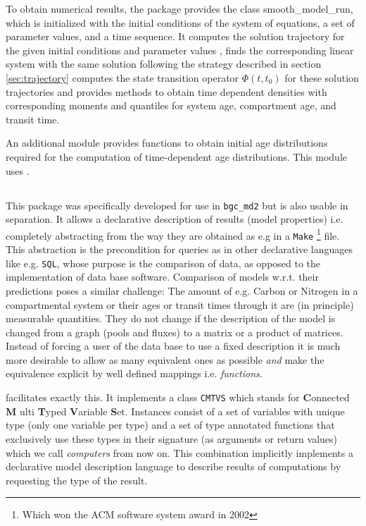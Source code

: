 To obtain numerical results, the package
provides the class smooth\_model\_run, which is initialized with the initial
conditions of the system of equations, a set of parameter values, and a time
sequence. It computes the solution trajectory for the given initial conditions and
parameter values , finds the corresponding linear system with the same solution
following the strategy described in section \ref{sec:trajectory} computes the
state transition operator $\Phi(t, t_0)$ for these solution trajectories and 
provides methods to obtain time dependent densities with corresponding moments and quantiles for system age, compartment age, and transit time. 

An additional module provides functions to obtain initial age distributions
required for the computation of time-dependent age distributions. 
This module uses \LAPM.

\subsection{\ComputabilityGraphs}
This package was specifically developed for use in \texttt{bgc\_md2} but is also usable in separation.
It allows a declarative description of results (model properties) i.e. completely abstracting from the way they are obtained as e.g in a \texttt{Make} 
\footnote{Which won the ACM software system award in 2002} file.  This
abstraction is the precondition for queries as in other declarative languages
like e.g. \texttt{SQL}, whose purpose is the comparison of data, as opposed to
the implementation of data base software.  Comparison of models w.r.t. their
predictions poses a similar challenge: The amount of e.g. Carbon or Nitrogen in
a compartmental system or their ages or transit times through it are (in
principle) measurable quantities. They do not change if the description of the
model is changed from a graph (pools and fluxes) to a matrix or a product of matrices.
Instead of forcing a user of the data base to use a fixed
description it is much more desirable to allow as many equivalent ones as
possible \emph{and} make the equivalence explicit by  well defined mappings i.e. \emph{functions}.

\ComputabilityGraphs facilitates exactly this.
It implements a class \texttt{CMTVS} which stands for 
{\bf C}onnected {\bf M} ulti {\bf T}yped {\bf V}ariable {\bf S}et. 
Instances consist of a set of variables with unique type (only one variable per type) and a set of type annotated functions that exclusively 
use these types in their signature (as arguments or return values) which we call \emph{computers} from now on.
This combination implicitly implements a declarative model description language to describe results of computations by requesting the type of the result. 

